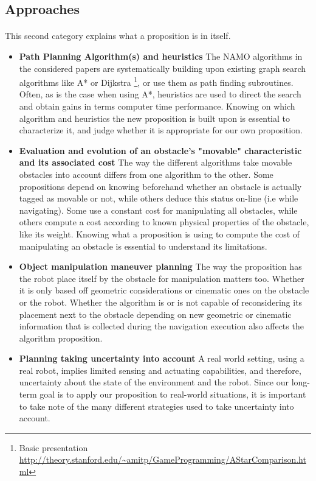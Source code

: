 \subsection{Approaches}

\paragraph{} This second category explains what a proposition is in itself.

\begin{itemize}
  \item \textbf{Path Planning Algorithm(s) and heuristics} The NAMO algorithms in the considered papers are systematically building upon existing graph search algorithms like A* or Dijkstra \footnote{Basic presentation \url{http://theory.stanford.edu/~amitp/GameProgramming/AStarComparison.html}}, or use them as path finding subroutines. Often, as is the case when using A*, heuristics are used to direct the search and obtain gains in terms computer time performance. Knowing on which algorithm and heuristics the new proposition is built upon is essential to characterize it, and judge whether it is appropriate for our own proposition.
  \item \textbf{Evaluation and evolution of an obstacle’s "movable" characteristic and its associated cost} The way the different algorithms take movable obstacles into account differs from one algorithm to the other. Some propositions depend on knowing beforehand whether an obstacle is actually tagged as movable or not, while others deduce this status on-line (i.e while navigating). Some use a constant cost for manipulating all obstacles, while others compute a cost according to known physical properties of the obstacle, like its weight. Knowing what a proposition is using to compute the cost of manipulating an obstacle is essential to understand its limitations.
  \item \textbf{Object manipulation maneuver planning} The way the proposition has the robot place itself by the obstacle for manipulation matters too. Whether it is only based off geometric considerations or cinematic ones on the obstacle or the robot. Whether the algorithm is or is not capable of reconsidering its placement next to the obstacle depending on new geometric or cinematic information that is collected during the navigation execution also affects the algorithm proposition.
  \item \textbf{Planning taking uncertainty into account} A real world setting, using a real robot, implies limited sensing and actuating capabilities, and therefore, uncertainty about the state of the environment and the robot. Since our long-term goal is to apply our proposition to real-world situations, it is important to take note of the many different strategies used to take uncertainty into account.
\end{itemize}

